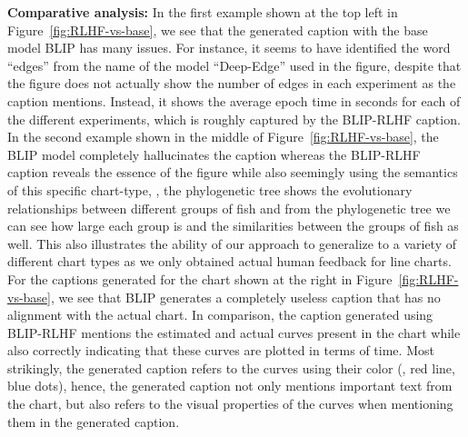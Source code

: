 \documentclass[11pt]{article}
\begin{document}
\textbf{Comparative analysis:}
In the first example shown at the top left in Figure~\ref{fig:RLHF-vs-base}, we see that the generated caption with the base model BLIP has many issues.
For instance, it seems to have identified the word ``edges'' from the name of the model ``Deep-Edge'' used in the figure, despite that the figure does not actually show the number of edges in each experiment as the caption mentions. 
Instead, it shows the average epoch time in seconds for each of the different experiments, which is roughly captured by the BLIP-RLHF caption.
In the second example shown in the middle of Figure~\ref{fig:RLHF-vs-base}, 
the BLIP model completely hallucinates the caption whereas the BLIP-RLHF caption reveals the essence of the figure while also seemingly using the semantics of this specific chart-type, \eg, the phylogenetic tree shows the evolutionary relationships between different groups of fish and from the phylogenetic tree we can see how large each group is and the similarities between the groups of fish as well.
This also illustrates the ability of our approach to generalize to a variety of different chart types as we only obtained actual human feedback for line charts.
% 
For the captions generated for the chart shown at the right in Figure~\ref{fig:RLHF-vs-base}, we see that BLIP generates a completely useless caption that has no alignment with the actual chart.
In comparison, the caption generated using BLIP-RLHF mentions the estimated and actual curves present in the chart while also correctly indicating that these curves are plotted in terms of time.
Most strikingly, the generated caption refers to the curves using their color (\ie, red line, blue dots), hence, the generated caption not only mentions important text from the chart, but also refers to the visual properties of the curves when mentioning them in the generated caption. 
\end{document}
